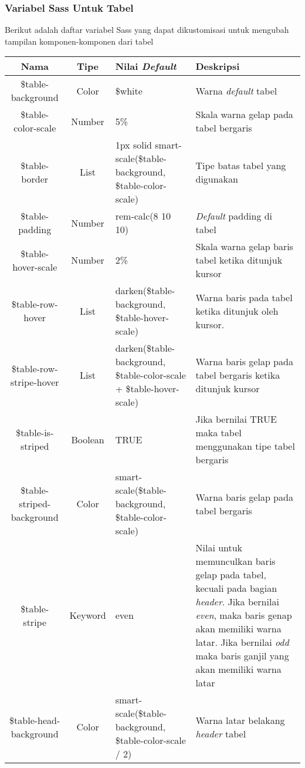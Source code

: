 \subsubsection{Variabel Sass Untuk Tabel}
Berikut adalah daftar variabel Sass yang dapat dikustomisasi untuk mengubah tampilan komponen-komponen dari tabel 
\begin{center}
	\begin{table}[H]
	\begin{tabular}{|c|c|p{4cm}|p{5cm}|}
 				\hline
			Nama & Tipe & Nilai \textit{Default} & Deskripsi  \\
				\hline
			 \$table-background & Color & \$white & Warna \textit{default} tabel \\
			 	\hline
			  \$table-color-scale & Number & 5\% & Skala warna gelap pada tabel bergaris\\
				 \hline
			  \$table-border & List & 	1px solid smart-scale(\$table-background, \$table-color-scale) & Tipe batas tabel yang digunakan \\
				 \hline
			 \$table-padding & Number & rem-calc(8 10 10) & \textit{Default} padding di tabel \\
			 	\hline
			  \$table-hover-scale & Number & 2\% & Skala warna gelap baris tabel ketika ditunjuk kursor \\
			 	\hline
			  \$table-row-hover & List & darken(\$table-background, \$table-hover-scale) & Warna baris pada tabel ketika ditunjuk oleh kursor. \\
			 	\hline
			 	\$table-row-stripe-hover & List & darken(\$table-background, \$table-color-scale + \$table-hover-scale) & Warna  baris gelap pada tabel bergaris ketika ditunjuk kursor \\
			 		\hline
			 	\$table-is-striped & Boolean & TRUE & Jika bernilai TRUE maka tabel menggunakan tipe tabel bergaris \\
			 		\hline
			 	\$table-striped-background & Color & smart-scale(\$table-background, \$table-color-scale) & Warna baris gelap pada tabel bergaris \\
			 		\hline
			 	\$table-stripe & Keyword & even & Nilai untuk memunculkan baris gelap pada tabel, kecuali pada bagian \textit{header}. Jika bernilai \textit{even}, maka baris genap akan memiliki warna latar. Jika bernilai \textit{odd} maka baris ganjil yang akan memiliki warna latar \\
			 	\hline
			 	\$table-head-background & Color & smart-scale(\$table-background, \$table-color-scale / 2) & Warna latar belakang \textit{header} tabel \\

\end{tabular}
\end{table}
\end{center}
